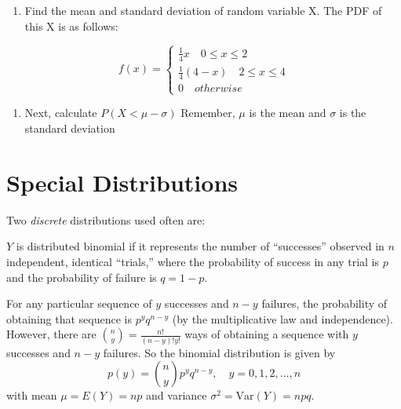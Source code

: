 \documentclass[
]{book}
\begin{document}
\begin{exercise}
\protect\hypertarget{exr:expvar3}{}\label{exr:expvar3}

\begin{enumerate}
\def\labelenumi{\arabic{enumi}.}
\tightlist
\item
  Find the mean and standard deviation of random variable X. The PDF of this X is as follows:
\end{enumerate}

\[f(x) =  \begin{cases}
              \frac{1}{4}x \quad 0 \leq x \leq 2\\
               \frac{1}{4}(4 - x)  \quad 2 \leq x \leq 4\\
               0 \quad otherwise
            \end{cases}
               \]

\begin{enumerate}
\def\labelenumi{\arabic{enumi}.}
\setcounter{enumi}{1}
\tightlist
\item
  Next, calculate \(P(X < \mu - \sigma)\) Remember, \(\mu\) is the mean and \(\sigma\) is the standard deviation
\end{enumerate}

\end{exercise}

\hypertarget{special-distributions}{%
\section{Special Distributions}\label{special-distributions}}

Two \emph{discrete} distributions used often are:

\begin{definition}
\protect\hypertarget{def:unnamed-chunk-87}{}\label{def:unnamed-chunk-87}\(Y\) is distributed binomial if it represents the number of ``successes'' observed in \(n\) independent, identical ``trials,'' where the probability of success in any trial is \(p\) and the probability of failure is \(q=1-p\).
\end{definition}

For any particular sequence of \(y\) successes and \(n-y\) failures, the probability of obtaining that sequence is \(p^y q^{n-y}\) (by the multiplicative law and independence). However, there are \(\binom{n}{y}=\frac{n!}{(n-y)!y!}\) ways of obtaining a sequence with \(y\) successes and \(n-y\) failures. So the binomial distribution is given by \[p(y)=\binom{n}{y}p^y q^{n-y}, \quad y=0,1,2,\ldots,n\] with mean \(\mu=E(Y)=np\) and variance \(\sigma^2=\text{Var}(Y)=npq\).
\end{document}
